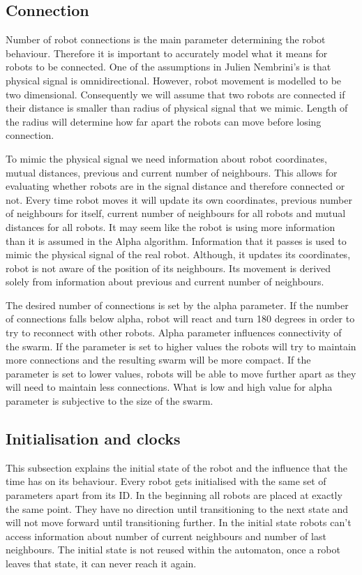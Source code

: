 \subsection{Connection}
Number of robot connections is the main parameter determining the robot behaviour. Therefore it is important to accurately model what it means for robots to be connected. One of the assumptions in Julien Nembrini's \cite{Minimalist_Coherent_Swarming_of_Wireless_Networked_Autonomous_Mobile_Robots} is that physical signal is omnidirectional. However, robot movement is modelled to be two dimensional. Consequently we will assume that two robots are connected if their distance is smaller than radius of physical signal that we mimic. Length of the radius will determine how far apart the robots can move before losing connection.

To mimic the physical signal we need information about robot coordinates, mutual distances, previous and current number of neighbours. This allows for evaluating whether robots are in the signal distance and therefore connected or not. Every time robot moves it will update its own coordinates, previous number of neighbours for itself, current number of neighbours for all robots and mutual distances for all robots. It may seem like the robot is using more information than it is assumed in the Alpha algorithm. Information that it passes is used to mimic the physical signal of the real robot. Although, it updates its coordinates, robot is not aware of the position of its neighbours. Its movement is derived solely from information about previous and current number of neighbours. 

The desired number of connections is set by the alpha parameter. If the number of connections falls below alpha, robot will react and turn 180 degrees in order to try to reconnect with other robots. Alpha parameter influences connectivity of the swarm. If the parameter is set to higher values the robots will try to maintain more connections and the resulting swarm will be more compact. If the parameter is set to lower values, robots will be able to move further apart as they will need to maintain less connections. What is low and high value for alpha parameter is subjective to the size of the swarm.

\subsection{Initialisation and clocks}
This subsection explains the initial state of the robot and the influence that the time has on its behaviour. Every robot gets initialised with the same set of parameters apart from its ID. In the beginning all robots are placed at exactly the same point. They have no direction until transitioning to the next state and will not move forward until transitioning further. In the initial state robots can't access information about number of current neighbours and number of last neighbours. The initial state is not reused within the automaton, once a robot leaves that state, it can never reach it again.

